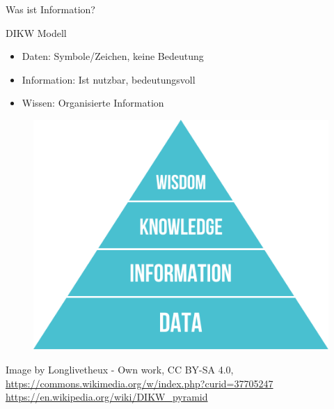 \documentclass{beamer}
\begin{document}
\begin{frame}[plain]{}
	
	\Huge
	\begin{center}
Was ist Information?	
	\end{center}
	
\end{frame}

\begin{frame}{DIKW Modell}
	
	\begin{minipage}[t]{0.65\textwidth}
		\begin{itemize}
			\item Daten: Symbole/Zeichen, keine Bedeutung
			\item Information: Ist nutzbar, bedeutungsvoll
			\item Wissen: Organisierte Information
		\end{itemize}
	\end{minipage}
	\begin{minipage}[t]{0.3\textwidth}
		\begin{figure}
			\includegraphics[scale=0.3,right]{dikw-pyramid.png}
		\end{figure}
	\end{minipage}
	
	\tiny
	\begin{flushright}
		Image by Longlivetheux - Own work, CC BY-SA 4.0,\\ \url{https://commons.wikimedia.org/w/index.php?curid=37705247}\\
		
		\vspace{0.2cm}
		\url{https://en.wikipedia.org/wiki/DIKW_pyramid}
	\end{flushright}
	
\end{frame}
\end{document}
